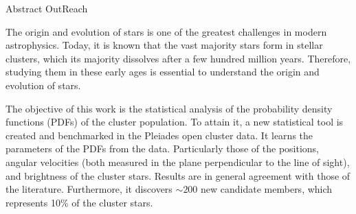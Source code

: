 

{\LARGE Abstract OutReach}

The origin and evolution of stars is one of the greatest challenges in modern astrophysics. Today, it is known that the vast majority stars form in stellar clusters, which its majority dissolves after a few hundred million years. Therefore, studying them in these early ages is essential to understand the origin and evolution of stars. 

The objective of this work is the statistical analysis of the probability density functions (PDFs) of the cluster population. To attain it, a new statistical tool is created and benchmarked in the Pleiades open cluster data. It learns the parameters of the PDFs from the data. Particularly those of the positions, angular velocities (both measured in the plane perpendicular to the line of sight), and brightness of the cluster stars. Results are in general agreement with those of the literature. Furthermore, it discovers $\sim200$ new candidate members, which represents 10\% of the cluster stars.


 






